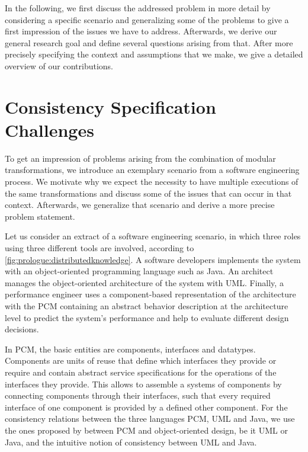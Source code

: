 In the following, we first discuss the addressed problem in more detail by considering a specific scenario and generalizing some of the problems to give a first impression of the issues we have to address.
Afterwards, we derive our general research goal and define several questions arising from that.
After more precisely specifying the context and assumptions that we make, we give a detailed overview of our contributions.



\section{Consistency Specification Challenges}

To get an impression of problems arising from the combination of modular transformations, we introduce an exemplary scenario from a software engineering process.
We motivate why we expect the necessity to have multiple executions of the same transformations and discuss some of the issues that can occur in that context.
Afterwards, we generalize that scenario and derive a more precise problem statement.

Let us consider an extract of a software engineering scenario, in which three roles using three different tools are involved, according to \autoref{fig:prologue:distributedknowledge}. 
A software developers implements the system with an object-oriented programming language such as Java.
An architect manages the object-oriented architecture of the system with \gls{UML}. 
Finally, a performance engineer uses a component-based representation of the architecture with the \gls{PCM} containing an abstract behavior description at the architecture level to predict the system's performance and help to evaluate different design decisions.

In \gls{PCM}, the basic entities are components, interfaces and datatypes.
Components are units of reuse that define which interfaces they provide or require and contain abstract service specifications for the operations of the interfaces they provide.
This allows to assemble a systems of components by connecting components through their interfaces, such that every required interface of one component is provided by a defined other component.
For the consistency relations between the three languages \gls{PCM}, \gls{UML} and Java, we use the ones proposed by \textcite{langhammer2017a} between \gls{PCM} and object-oriented design, be it \gls{UML} or Java, and the intuitive notion of consistency between \gls{UML} and Java.

